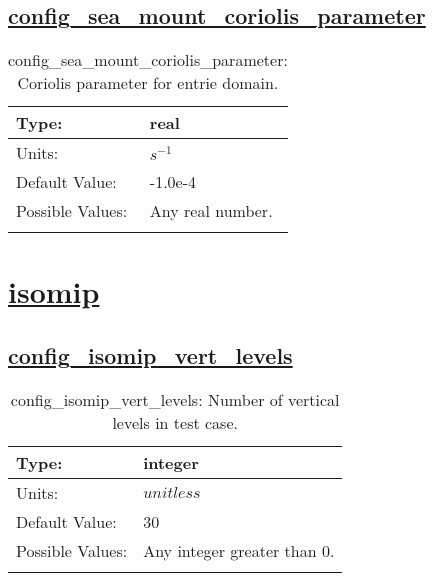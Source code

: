 \subsection[config\_sea\_mount\_coriolis\_parameter]{\hyperref[sec:nm_tab_sea_mount]{config\_sea\_mount\_coriolis\_parameter}}
\label{subsec:nm_sec_config_sea_mount_coriolis_parameter}
\begin{center}
\begin{longtable}{| p{2.0in} || p{4.0in} |}
    \hline
    Type: & real \\
    \hline
    Units: & $s^{-1}$ \\
    \hline
    Default Value: & -1.0e-4 \\
    \hline
    Possible Values: & Any real number. \\
    \hline
    \caption{config\_sea\_mount\_coriolis\_parameter: Coriolis parameter for entrie domain.}
\end{longtable}
\end{center}
\section[isomip]{\hyperref[sec:nm_tab_isomip]{isomip}}
\label{sec:nm_sec_isomip}
\subsection[config\_isomip\_vert\_levels]{\hyperref[sec:nm_tab_isomip]{config\_isomip\_vert\_levels}}
\label{subsec:nm_sec_config_isomip_vert_levels}
\begin{center}
\begin{longtable}{| p{2.0in} || p{4.0in} |}
    \hline
    Type: & integer \\
    \hline
    Units: & $unitless$ \\
    \hline
    Default Value: & 30 \\
    \hline
    Possible Values: & Any integer greater than 0. \\
    \hline
    \caption{config\_isomip\_vert\_levels: Number of vertical levels in test case.}
\end{longtable}
\end{center}
